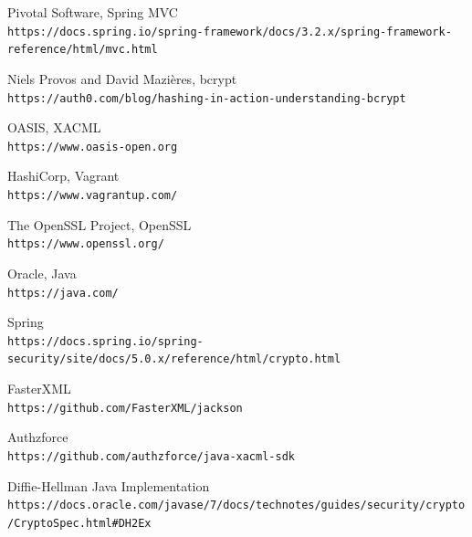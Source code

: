 \begin{thebibliography}{9}
Pivotal Software, Spring MVC
\\\texttt{https://docs.spring.io/spring-framework/docs/3.2.x/spring-framework-reference/html/mvc.html}

Niels Provos and David Mazières, bcrypt
\\\texttt{https://auth0.com/blog/hashing-in-action-understanding-bcrypt}

OASIS, XACML
\\\texttt{https://www.oasis-open.org}

HashiCorp, Vagrant
\\\texttt{https://www.vagrantup.com/}

The OpenSSL Project, OpenSSL
\\\texttt{https://www.openssl.org/}

Oracle, Java
\\\texttt{https://java.com/}

Spring
\\\texttt{https://docs.spring.io/spring-security/site/docs/5.0.x/reference/html/crypto.html}

FasterXML
\\\texttt{https://github.com/FasterXML/jackson}


Authzforce
\\\texttt{https://github.com/authzforce/java-xacml-sdk}

Diffie-Hellman Java Implementation
\\\texttt{https://docs.oracle.com/javase/7/docs/technotes/guides/security/crypto/CryptoSpec.html#DH2Ex}



\end{thebibliography}

